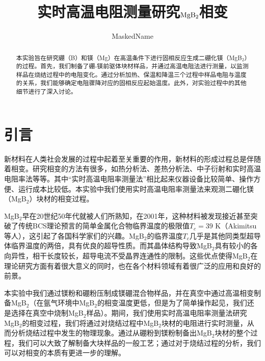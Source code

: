 \documentclass[font=default]{mpltx}
\begin{document}
\title{实时高温电阻测量研究${\rm MgB_2}$相变} %
\author{MaskedName} %
\date{}
\begin{abstract}
本实验旨在研究硼（B）和镁（Mg）在高温条件下进行固相反应生成二硼化镁（MgB$_2$）的过程。首先，我们制备了硼-镁前驱体块材样品，并通过高温电阻法进行测量，以监测样品在烧结过程中的电阻变化。通过分析加热、保温和降温三个过程中样品电阻与温度的关系，我们能够确定电阻骤降对应的固相反应起始温度。此外，对实验过程中的其他细节进行了深入讨论。
\end{abstract}


\maketitle

\section{引言}
新材料在人类社会发展的过程中起着至关重要的作用，新材料的形成过程总是伴随着相变。研究相变的方法有很多，如热分析法、差热分析法、中子衍射和实时高温电阻率法等等。其中“实时高温电阻率测量法”相比起来仪器设备比较简单、操作方便、运行成本比较低。本实验中我们使用实时高温电阻率测量法来观测二硼化镁（MgB$_2$）块材的相变过程。

MgB$_2$早在20世纪50年代就被人们所熟知，在2001年，这种材料被发现接近甚至突破了传统BCS理论预言的简单金属化合物临界温度的极限值$T_c=39$ K（Akimitsu等人），这引起了各国科学家们的兴趣。MgB$_2$的临界温度$T_c$几乎是其他同类型超导体临界温度的两倍，具有优良的超导性质。而其晶体结构导致MgB$_2$具有较小的各向异性，相干长度较长，超导电流不受晶界连通性的限制。这些优点使得MgB$_2$在理论研究方面有着很大意义的同时，也在各个材料领域有着很广泛的应用和良好的前景。

本实验中我们通过镁粉和硼粉压制成镁硼混合物样品，并在真空中通过高温相变制备MgB$_2$（在氩气环境中MgB$_2$的相变温度更低\cite{Feng}，但是为了简单操作起见，我们还是选择在真空中烧制MgB$_2$样品）。期间，我们使用实时高温电阻率测量法研究MgB$_2$的相变过程，我们将通过对烧结过程中MgB$_2$块材的电阻进行实时测量，从而分析烧结过程中发生的物理现象。通过从硼粉到镁粉制备出MgB$_2$块材的整个过程，我们可以大致了解制备大块样品的一般工艺；通过对于烧结过程的分析，我们可以对相变的本质有更进一步的理解。
\end{document}
